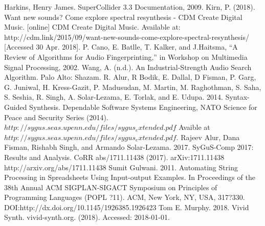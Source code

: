 \documentclass[english, 11pt]{article}
\begin{document}
\begin{thebibliography}{9}
Harkins, Henry James. SuperCollider 3.3 Documentation, 2009.
Kirn, P. (2018). Want new sounds? Come explore spectral resynthesis - CDM Create Digital Music. [online] CDM Create Digital Music. Available at: http://cdm.link/2015/09/want-new-sounds-come-explore-spectral-resynthesis/ [Accessed 30 Apr. 2018].
P. Cano, E. Batlle, T. Kalker, and J.Haitsma, ``A Review of Algorithms for Audio Fingerprinting,'' in Workshop on Multimedia Signal Processing, 2002.
Wang, A. (n.d.). An Industrial-Strength Audio Search Algorithm. Palo Alto: Shazam.
R. Alur, R Bodik, E. Dallal, D Fisman, P. Garg, G. Juniwal, H. Kress-Gazit, P. Madusudan, M. Martin, M. Raghothman, S. Saha, S. Seshia, R. Singh, A. Solar-Lezama, E. Torlak, and E. Udupa. 2014. Syntax-Guided Synthesis. Dependable Software Systems Engineering, NATO Science for Peace and Security Series (2014). $http://sygus.seas.upenn.edu/files/sygus_extended.pdf$ Avaible at $http://sygus.seas.upenn.edu/files/sygus_extended.pdf.$
Rajeev Alur, Dana Fisman, Rishabh Singh, and Armando Solar-Lezama. 2017. SyGuS-Comp 2017: Results and Analysis. CoRR abs/1711.11438 (2017). arXiv:1711.11438 http://arxiv.org/abs/1711.11438
Sumit Gulwani. 2011. Automating String Processing in Spreadsheets Using Input-output Examples. In Proceedings of the 38th Annual ACM SIGPLAN-SIGACT Symposium on Principles of Programming Languages (POPL ?11). ACM, New York, NY, USA, 317?330. DOI:http://dx.doi.org/10.1145/1926385.1926423
Tom E. Murphy. 2018. Vivid Synth. vivid-synth.org. (2018). Accessed: 2018-01-01.

\end{thebibliography}
\end{document}
